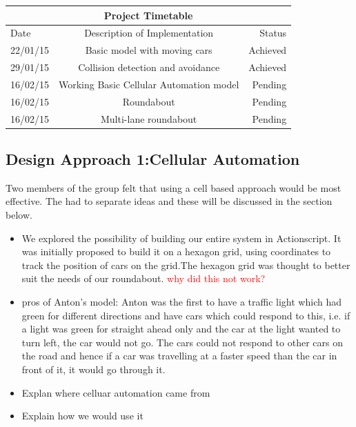 \documentclass[11pt]{article}
\begin{document}
\begin{tabular}{ | l | c | r | }
	 \hline
	\multicolumn{3}{|c|}{Project Timetable}  \\ \hline
	Date & Description of Implementation & Status \\ \hline
	22/01/15 & Basic model with moving cars &  Achieved \\ \hline
	29/01/15 & Collision detection and avoidance & Achieved \\ \hline
	16/02/15 & Working Basic Cellular Automation model & Pending \\ \hline
	16/02/15 & Roundabout & Pending \\ \hline
	16/02/15 & Multi-lane roundabout & Pending \\ \hline
	
\end{tabular}
\subsection{Design Approach 1:Cellular Automation}
Two members of the group felt that using a cell based approach would be most effective. The had to separate ideas and these will be discussed in the section below. 
	


\begin{itemize}
	\item We explored the possibility of building our entire system in Actionscript. It was initially proposed to build it on a hexagon grid, using coordinates to track the position of cars on the grid.The hexagon grid was thought to better suit the needs of our roundabout. \textcolor{red}{why did this not work?} 
	\item pros of Anton's model: Anton was the first to have a traffic light which had green for different directions and have cars which could respond to this, i.e. if a light was green for straight ahead only and the car at the light wanted to turn left, the car would not go. The cars could not respond to other cars on the road and hence if a car was travelling at a faster speed than the car in front of it, it would go through it. 
\end{itemize}


\begin{itemize}
	\item Explan where celluar automation came from
	\item Explain how we would use it
\end{itemize}
\end{document}

